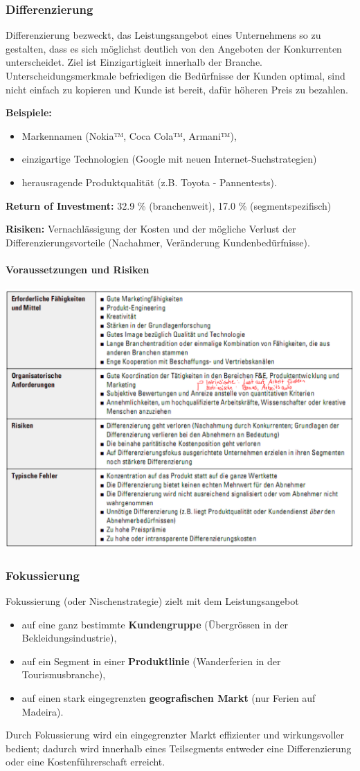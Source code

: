 \subsubsection{Differenzierung}
Differenzierung bezweckt, das Leistungsangebot eines Unternehmens so zu gestalten, dass es sich möglichst deutlich von den Angeboten der Konkurrenten unterscheidet. Ziel ist Einzigartigkeit innerhalb der Branche. Unterscheidungsmerkmale befriedigen die Bedürfnisse der Kunden optimal, sind nicht einfach zu kopieren und Kunde ist bereit, dafür höheren Preis zu bezahlen.

\textbf{Beispiele:}
\begin{itemize}
	\item Markennamen (Nokia™, Coca Cola™, Armani™),
	\item einzigartige Technologien (Google mit neuen Internet-Suchstrategien)
	\item herausragende Produktqualität (z.B. Toyota - Pannentests).
\end{itemize}

\textbf{Return of Investment:} 32.9 \% (branchenweit), 17.0 \% (segmentspezifisch)

\textbf{Risiken:} Vernachlässigung der Kosten und der mögliche Verlust der Differenzierungsvorteile (Nachahmer, Veränderung Kundenbedürfnisse).

\paragraph{Voraussetzungen und Risiken}
\includegraphics[width=0.7\linewidth]{images/risiko_differenzierung}

\subsubsection{Fokussierung}
Fokussierung (oder Nischenstrategie) zielt mit dem Leistungsangebot
\begin{itemize}
	\item auf eine ganz bestimmte \textbf{Kundengruppe} (Übergrössen in der Bekleidungsindustrie),
	\item auf ein Segment in einer \textbf{Produktlinie} (Wanderferien in der Tourismusbranche),
	\item auf einen stark eingegrenzten \textbf{geografischen Markt} (nur Ferien auf Madeira).
\end{itemize}
Durch Fokussierung wird ein eingegrenzter Markt effizienter und wirkungsvoller bedient; dadurch wird innerhalb eines Teilsegments entweder eine Differenzierung oder eine Kostenführerschaft erreicht.

